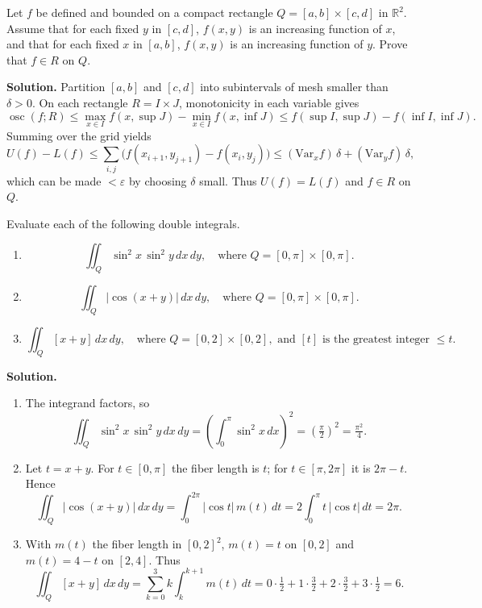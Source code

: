 \begin{problembox}
Let \( f \) be defined and bounded on a compact rectangle \( Q = [a, b] \times [c, d] \) in \( \mathbb{R}^2 \). Assume that for each fixed \( y \) in \([c, d]\), \( f(x, y) \) is an increasing function of \( x \), and that for each fixed \( x \) in \([a, b]\), \( f(x, y) \) is an increasing function of \( y \). Prove that \( f \in R \) on \( Q \).
\end{problembox}

\noindent\textbf{Solution.}
Partition $[a,b]$ and $[c,d]$ into subintervals of mesh smaller than $\delta>0$. On each rectangle $R=I\times J$, monotonicity in each variable gives
\[ \operatorname{osc}(f;R) \le \max_{x\in I}\!f(x,\sup J)-\min_{x\in I}\!f(x,\inf J) \le f(\sup I,\sup J)-f(\inf I,\inf J). \]
Summing over the grid yields
\[ U(f)-L(f) \le \sum_{i,j} \big(f(x_{i+1},y_{j+1})-f(x_i,y_j)\big) \le (\text{Var}_x f)\,\delta + (\text{Var}_y f)\,\delta, \]
which can be made $<\varepsilon$ by choosing $\delta$ small. Thus $U(f)=L(f)$ and $f\in R$ on $Q$.

\begin{problembox}
Evaluate each of the following double integrals.
\begin{enumerate}[label=(\alph*)]
    \item \[ \iint_{Q} \sin^2 x \, \sin^2 y \, dx \, dy, \quad \text{where } Q = [0, \pi] \times [0, \pi]. \]
    \item \[ \iint_{Q} |\cos (x + y)| \, dx \, dy, \quad \text{where } Q = [0, \pi] \times [0, \pi]. \]
    \item \[ \iint_{Q} [x + y] \, dx \, dy, \quad \text{where } Q = [0, 2] \times [0, 2], \text{ and } [t] \text{ is the greatest integer } \leq t. \]
\end{enumerate}
\end{problembox}

\noindent\textbf{Solution.}
\begin{enumerate}[label=(\alph*)]
    \item The integrand factors, so
    \[ \iint_Q \sin^2 x\,\sin^2 y\,dx\,dy = \left(\int_0^{\pi} \sin^2 x\,dx\right)^2 = \left(\tfrac{\pi}{2}\right)^2 = \tfrac{\pi^2}{4}. \]
    \item Let $t=x+y$. For $t\in[0,\pi]$ the fiber length is $t$; for $t\in[\pi,2\pi]$ it is $2\pi-t$. Hence
    \[ \iint_Q |\cos(x+y)|\,dx\,dy = \int_0^{2\pi} |\cos t|\,m(t)\,dt = 2\int_0^{\pi} t\,|\cos t|\,dt = 2\pi. \]
    \item With $m(t)$ the fiber length in $[0,2]^2$, $m(t)=t$ on $[0,2]$ and $m(t)=4-t$ on $[2,4]$. Thus
    \[ \iint_Q [x+y]\,dx\,dy = \sum_{k=0}^3 k\int_k^{k+1} m(t)\,dt = 0\cdot\tfrac{1}{2} + 1\cdot\tfrac{3}{2} + 2\cdot\tfrac{3}{2} + 3\cdot\tfrac{1}{2} = 6. \]
\end{enumerate}

